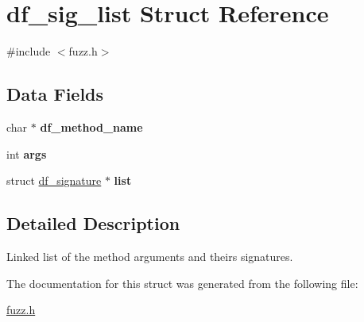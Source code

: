 \hypertarget{structdf__sig__list}{\section{df\-\_\-sig\-\_\-list Struct Reference}
\label{structdf__sig__list}
}


{\ttfamily \#include $<$fuzz.\-h$>$}

\subsection*{Data Fields}
\begin{DoxyCompactItemize}
\item 
\hypertarget{structdf__sig__list_a2a1c50f8fea270bdbb6af9d271870df0}{char $\ast$ {\bfseries df\-\_\-method\-\_\-name}}\label{structdf__sig__list_a2a1c50f8fea270bdbb6af9d271870df0}

\item 
\hypertarget{structdf__sig__list_a8bece28793b2f663276289705de9f348}{int {\bfseries args}}\label{structdf__sig__list_a8bece28793b2f663276289705de9f348}

\item 
\hypertarget{structdf__sig__list_a0504654defb3526d64463f9d2b947946}{struct \hyperlink{structdf__signature}{df\-\_\-signature} $\ast$ {\bfseries list}}\label{structdf__sig__list_a0504654defb3526d64463f9d2b947946}

\end{DoxyCompactItemize}


\subsection{Detailed Description}
Linked list of the method arguments and theirs signatures. 

The documentation for this struct was generated from the following file\-:\begin{DoxyCompactItemize}
\item 
\hyperlink{fuzz_8h}{fuzz.\-h}\end{DoxyCompactItemize}
